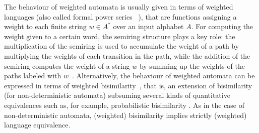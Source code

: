\documentclass[3p]{elsarticle}
\newcommand{\mik}[1]{\marginpar{ \textbf{MiB:} {\footnotesize #1}}} %
\begin{document}
The behaviour of weighted automata is usually given in terms of
weighted languages (also called formal power series ~\cite{SS78,BR-series}),
that are functions assigning a weight to each finite string  $w \in A^*$ over
an input alphabet $A$. For computing the weight
given to a certain word, the semiring structure plays a key role:
 the multiplication of the semiring is used to accumulate
the  weight of a path by multiplying the weights of each transition
in the path, while the addition of the semiring computes the weight of
a string $w$ by summing up the weights of the paths labeled with
$w$~\cite{Kui97}.
%
Alternatively, the behaviour of weighted automata can be expressed in terms of
weighted bisimilarity~\cite{german}, that is, an extension of bisimilarity (for
non-deterministic automata) subsuming several kinds of quantitative equivalences
such as, for example, probabilistic bisimilarity \cite{DBLP:conf/concur/JouS90}.
As in the case of non-deterministic automata, (weighted) bisimilarity implies
strictly (weighted) language equivalence.


\end{document}
